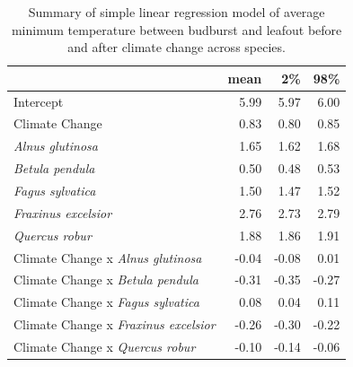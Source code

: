 \documentclass{article}\usepackage[]{graphicx}\usepackage[]{color}
\begin{document}
\begin{table}[H]
\centering
\caption{Summary of simple linear regression model of average minimum temperature between budburst and leafout before and after climate change across species.} 
\begin{tabular}{lrrr}
  \hline
 & mean & 2\% & 98\% \\ 
  \hline
Intercept & 5.99 & 5.97 & 6.00 \\ 
  Climate Change & 0.83 & 0.80 & 0.85 \\ 
  \textit{Alnus glutinosa} & 1.65 & 1.62 & 1.68 \\ 
  \textit{Betula pendula} & 0.50 & 0.48 & 0.53 \\ 
  \textit{Fagus sylvatica} & 1.50 & 1.47 & 1.52 \\ 
  \textit{Fraxinus excelsior} & 2.76 & 2.73 & 2.79 \\ 
  \textit{Quercus robur} & 1.88 & 1.86 & 1.91 \\ 
  Climate Change x \textit{Alnus glutinosa} & -0.04 & -0.08 & 0.01 \\ 
  Climate Change x \textit{Betula pendula} & -0.31 & -0.35 & -0.27 \\ 
  Climate Change x \textit{Fagus sylvatica} & 0.08 & 0.04 & 0.11 \\ 
  Climate Change x \textit{Fraxinus excelsior} & -0.26 & -0.30 & -0.22 \\ 
  Climate Change x \textit{Quercus robur} & -0.10 & -0.14 & -0.06 \\ 
   \hline
\end{tabular}
\end{table}
\end{document}
